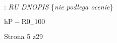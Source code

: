 \documentclass[a4paper,12pt]{article}
\begin{document}
: {\it RU DNOPIS} \{{\it nie podlega ocenie}\}

$\mathrm{h}\mathrm{P}-\mathrm{R}0_{-}100$

Strona 5 z29
\end{document}

